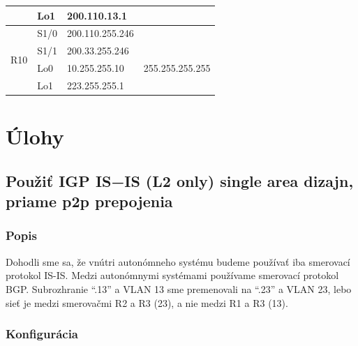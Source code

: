\documentclass[12pt,twoside,a4paper]{report}
\begin{document}
\begin{table}[!htbp]
\begin{tabular}{|c|l|l|l|}
                     & Lo1                                     & 200.110.13.1                            &                                     \\ \hline
\multirow{4}{*}{R10} & S1/0                                    & 200.110.255.246                         &                                     \\ \cline{2-4} 
                     & S1/1                                    & 200.33.255.246                          &                                     \\ \cline{2-4} 
                     & Lo0                                     & 10.255.255.10                           & 255.255.255.255                     \\ \cline{2-4} 
                     & Lo1                                     & 223.255.255.1                           &                                     \\ \hline
\end{tabular}
\end{table}


\newpage

\section{Úlohy}
\subsection{Použiť IGP IS−IS (L2 only) single area dizajn, priame p2p prepojenia}


\subsubsection{Popis}
Dohodli sme sa, že vnútri autonómneho systému budeme používať iba smerovací protokol IS-IS. Medzi autonómnymi systémami používame smerovací protokol BGP. Subrozhranie “.13” a VLAN 13 sme premenovali na “.23” a VLAN 23, lebo sieť je medzi smerovačmi R2 a R3 (23), a nie medzi R1 a R3 (13).


\subsubsection{Konfigurácia}
\end{document}
